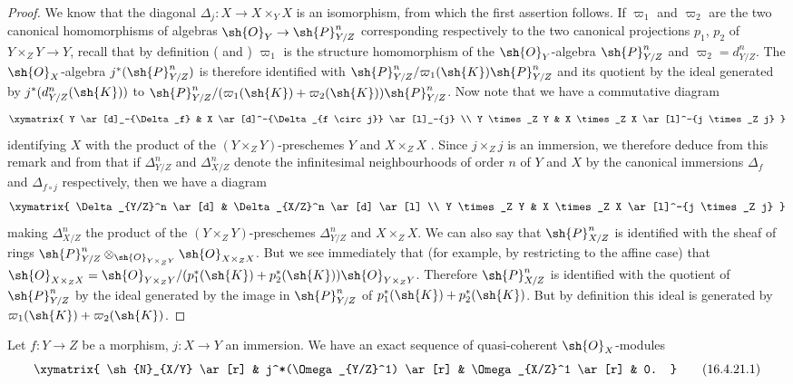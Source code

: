 \begin{proof}
We know  that the diagonal $\Delta_j:X \to X \times_Y X$ is an isomorphism, from which the first assertion follows.
If $\varpi_1$ and $\varpi_2$ are the two canonical homomorphisms of algebras $\sh{O}_Y \to \sh{P}_{Y/Z}^n$ corresponding respectively to the two canonical projections $p_1$, $p_2$ of $Y \times_Z Y \to Y$, recall that by definition ( and ) $\varpi_1$ is the structure homomorphism of the $\sh{O}_Y$-algebra $\sh{P}_{Y/Z}^n$ and $\varpi_2 = d_{Y/Z}^n$.
The $\sh{O}_X$-algebra $j^*(\sh{P}_{Y/Z}^n)$ is therefore identified with $\sh{P}_{Y/Z}^n/\varpi_1(\sh{K})\sh{P}_{Y/Z}^n$ and its quotient by the ideal generated by $j^*(d_{Y/Z}^n(\sh{K}))$ to $\sh{P}_{Y/Z}^n/(\varpi_1(\sh{K}) + \varpi_2(\sh{K}))\sh{P}_{Y/Z}^n$.
Now note that we have a commutative diagram
\[
  \xymatrix{
  Y \ar[d]_-{\Delta_f} & X \ar[d]^-{\Delta_{f \circ j}} \ar[l]_-{j}  \\
  Y \times_Z Y & X \times_Z X \ar[l]^-{j \times_Z j} 
  }
\]
identifying $X$ with the product of the $(Y \times_Z Y)$-preschemes $Y$ and $X \times_Z X$ .
Since $j \times_Z j$ is an immersion, we therefore deduce from this remark and from  that if $\Delta_{Y/Z}^n$ and $\Delta_{X/Z}^n$ denote the infinitesimal neighbourhoods of order $n$ of $Y$ and $X$ by the canonical immersions $\Delta_f$ and $\Delta_{f\circ j}$ respectively, then we have a diagram
\[
  \xymatrix{
  \Delta_{Y/Z}^n \ar[d] & \Delta_{X/Z}^n \ar[d] \ar[l]  \\
  Y \times_Z Y & X \times_Z X \ar[l]^-{j \times_Z j} 
  }
\]
making $\Delta_{X/Z}^n$ the product of the $(Y \times_Z Y)$-preschemes $\Delta_{Y/Z}^n$ and $X \times_Z X$.
We can also say that $\sh{P}_{X/Z}^n$ is identified with the sheaf of rings $\sh{P}_{Y/Z}^n \otimes_{\sh{O}_{Y \times_Z Y}} \sh{O}_{X \times_Z X}$.
But we see immediately that (for example, by restricting to the affine case) that $\sh{O}_{X \times_Z X} = \sh{O}_{Y \times_Z Y}/(p_1^*(\sh{K}) + p_2^*(\sh{K}))\sh{O}_{Y \times_Z Y}$.
Therefore $\sh{P}_{X/Z}^n$ is identified with the quotient of $\sh{P}_{Y/Z}^n$ by the ideal generated by the image in $\sh{P}_{Y/Z}^n$ of $p_1^*(\sh{K}) + p_2^*(\sh{K})$.
But by definition this ideal is generated by $\varpi_1(\sh{K}) + \varpi_2(\sh{K})$. 
\end{proof}

\begin{corollary}[16.4.21]
\label{IV.16.4.21}
Let $f:Y \to Z$ be a morphism, $j: X \to Y$ an immersion.
We have an exact sequence of quasi-coherent $\sh{O}_X$-modules
\[
  \label{IV.16.4.21.1}
  \xymatrix{
    \sh{N}_{X/Y} \ar[r] & j^*(\Omega_{Y/Z}^1) \ar[r] & \Omega_{X/Z}^1 \ar[r] & 0.
  }
  \tag{16.4.21.1}
\]
\end{corollary}

